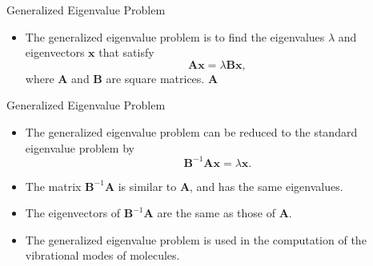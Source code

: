 \documentclass{beamer}
\begin{document}
\begin{frame}{Generalized Eigenvalue Problem}
    \begin{itemize}
    \item The generalized eigenvalue problem is to find the eigenvalues $\lambda$ and eigenvectors $\mathbf{x}$ that satisfy
    \[
    \mathbf{A x}=\lambda \mathbf{B x},
    \]
    where $\mathbf{A}$ and $\mathbf{B}$ are square matrices. $\mathbf{A}$
    \end{itemize}
\end{frame}
\begin{frame}{Generalized Eigenvalue Problem}
    \begin{itemize}
        \item The generalized eigenvalue problem can be reduced to the standard eigenvalue problem by 
        \[
        \mathbf{B}^{-1} \mathbf{A x}=\lambda \mathbf{x}.
        \]
        \item The matrix $\mathbf{B}^{-1} \mathbf{A}$ is similar to $\mathbf{A}$, and has the same eigenvalues.
        \item The eigenvectors of $\mathbf{B}^{-1} \mathbf{A}$ are the same as those of $\mathbf{A}$.
        \item The generalized eigenvalue problem is used in the computation of the vibrational modes of molecules.
    \end{itemize}
\end{frame}
\end{document}
